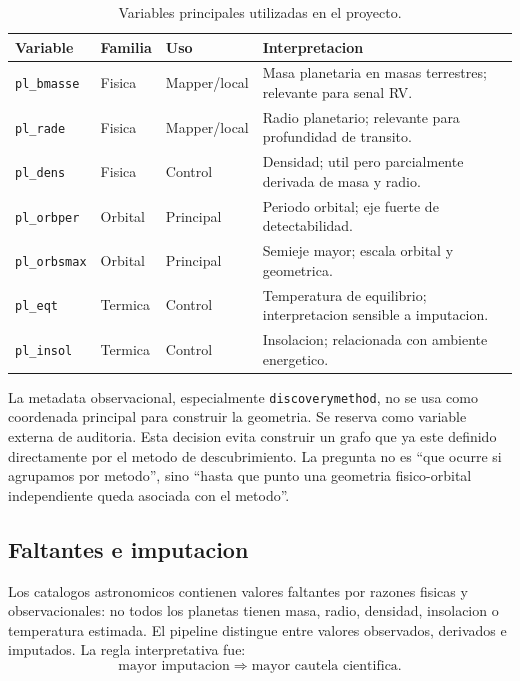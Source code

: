 \documentclass[11pt]{article}
\begin{document}
\begin{table}[H]
\centering
\caption{Variables principales utilizadas en el proyecto.}
\begin{tabularx}{\linewidth}{lllX}
\toprule
Variable & Familia & Uso & Interpretacion \\
\midrule
\texttt{pl\_bmasse} & Fisica & Mapper/local & Masa planetaria en masas terrestres; relevante para senal RV. \\
\texttt{pl\_rade} & Fisica & Mapper/local & Radio planetario; relevante para profundidad de transito. \\
\texttt{pl\_dens} & Fisica & Control & Densidad; util pero parcialmente derivada de masa y radio. \\
\texttt{pl\_orbper} & Orbital & Principal & Periodo orbital; eje fuerte de detectabilidad. \\
\texttt{pl\_orbsmax} & Orbital & Principal & Semieje mayor; escala orbital y geometrica. \\
\texttt{pl\_eqt} & Termica & Control & Temperatura de equilibrio; interpretacion sensible a imputacion. \\
\texttt{pl\_insol} & Termica & Control & Insolacion; relacionada con ambiente energetico. \\
\bottomrule
\end{tabularx}
\end{table}

La metadata observacional, especialmente \texttt{discoverymethod}, no se usa como coordenada principal para construir la geometria. Se reserva como variable externa de auditoria. Esta decision evita construir un grafo que ya este definido directamente por el metodo de descubrimiento. La pregunta no es ``que ocurre si agrupamos por metodo'', sino ``hasta que punto una geometria fisico-orbital independiente queda asociada con el metodo''.

\subsection{Faltantes e imputacion}

Los catalogos astronomicos contienen valores faltantes por razones fisicas y observacionales: no todos los planetas tienen masa, radio, densidad, insolacion o temperatura estimada. El pipeline distingue entre valores observados, derivados e imputados. La regla interpretativa fue:
\[
  \text{mayor imputacion} \Rightarrow \text{mayor cautela cientifica}.
\]
\end{document}

